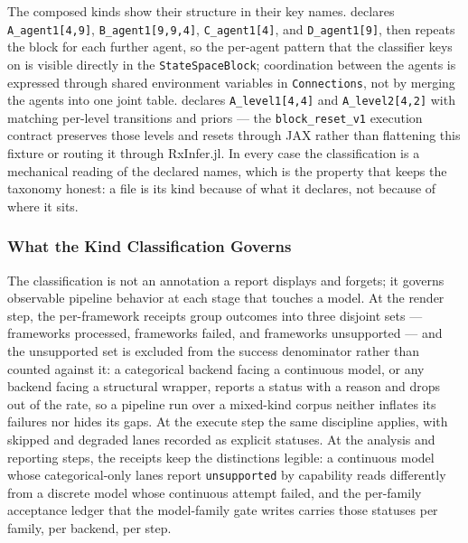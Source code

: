 \documentclass[
  english,
  9pt,
]{extarticle}
\begin{document}
The composed kinds show their structure in their key names.
 declares
\texttt{A\_agent1{[}4,9{]}}, \texttt{B\_agent1{[}9,9,4{]}},
\texttt{C\_agent1{[}4{]}}, and \texttt{D\_agent1{[}9{]}}, then repeats
the block for each further agent, so the per-agent pattern that the
classifier keys on is visible directly in the \texttt{StateSpaceBlock};
coordination between the agents is expressed through shared environment
variables in \texttt{Connections}, not by merging the agents into one
joint table.
 declares
\texttt{A\_level1{[}4,4{]}} and \texttt{A\_level2{[}4,2{]}} with
matching per-level transitions and priors --- the
\texttt{block\_reset\_v1} execution contract preserves those levels and
resets through JAX rather than flattening this fixture or routing it
through RxInfer.jl. In every case the classification is a mechanical
reading of the declared names, which is the property that keeps the
taxonomy honest: a file is its kind because of what it declares, not
because of where it sits.

\subsubsection{What the Kind Classification
Governs}\label{what-the-kind-classification-governs}

The classification is not an annotation a report displays and forgets;
it governs observable pipeline behavior at each stage that touches a
model. At the render step, the per-framework receipts group outcomes
into three disjoint sets --- frameworks processed, frameworks failed,
and frameworks unsupported --- and the unsupported set is excluded from
the success denominator rather than counted against it: a categorical
backend facing a continuous model, or any backend facing a structural
wrapper, reports a status with a reason and drops out of the rate, so a
pipeline run over a mixed-kind corpus neither inflates its failures nor
hides its gaps. At the execute step the same discipline applies, with
skipped and degraded lanes recorded as explicit statuses. At the
analysis and reporting steps, the receipts keep the distinctions
legible: a continuous model whose categorical-only lanes report
\texttt{unsupported} by capability reads differently from a discrete
model whose continuous attempt failed, and the per-family acceptance
ledger that the model-family gate writes carries those statuses per
family, per backend, per step.
\end{document}
